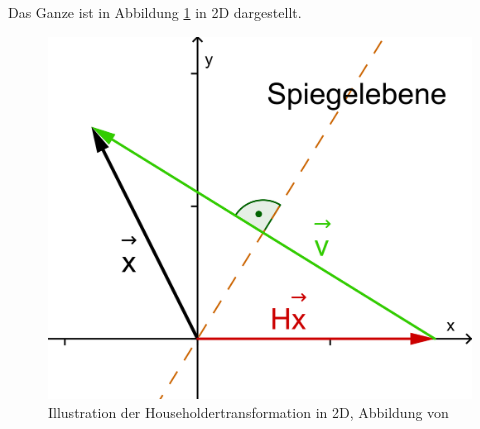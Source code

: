 Das Ganze ist in Abbildung \ref{francis:abb:householder_transform} in 2D dargestellt.
\begin{figure}
	\begin{center}
		\includegraphics[scale=0.1]{papers/francis/images/Householdertransformation.png}
		\caption{Illustration der Householdertransformation in 2D, Abbildung von \cite{francis:householder}}
		\label{francis:abb:householder_transform}
	\end{center}
\end{figure}
